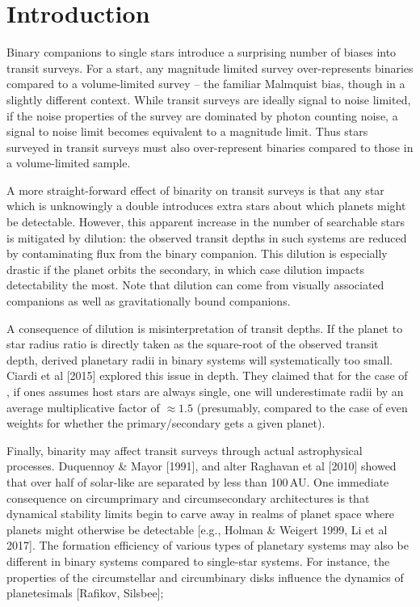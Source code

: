 \documentclass{emulateapj}
\begin{document}

\section{Introduction}

Binary companions to single stars introduce a surprising number of biases into 
transit surveys.
For a start, any magnitude limited survey over-represents binaries compared to 
a volume-limited survey -- the familiar Malmquist bias, though in a slightly 
different context.
While transit surveys are ideally signal to noise limited, if the noise 
properties of the survey are dominated by photon counting noise, a signal to 
noise limit becomes equivalent to a magnitude limit.
Thus stars surveyed in transit surveys must also over-represent binaries 
compared to those in a volume-limited sample.

A more straight-forward effect of binarity on transit surveys is that any star 
which is unknowingly a double introduces extra stars about which planets might 
be detectable.
However, this apparent increase in the number of searchable stars is mitigated 
by dilution: the observed transit depths in such systems are reduced by 
contaminating flux from the binary companion. This dilution is especially 
drastic if the planet orbits the secondary, in which case dilution impacts 
detectability the most.
Note that dilution can come from visually associated companions as well as 
gravitationally bound companions.

A consequence of dilution is misinterpretation of transit depths. If the 
planet to star radius ratio is directly taken as the square-root of 
the observed transit depth, derived planetary radii in binary systems will 
systematically too small.
Ciardi et al [2015] explored this issue in depth. They claimed that for the 
case of \kepler, if ones assumes host stars are always single, one will
underestimate radii by an average multiplicative factor of $\approx 1.5$ 
(presumably, compared to the case of even weights for whether the 
primary/secondary gets a given planet).

Finally, binarity may affect transit surveys through actual astrophysical 
processes.
Duquennoy \& Mayor [1991], and alter Raghavan et al [2010] showed that over 
half of solar-like are separated by less than 100\,AU.
One immediate consequence on circumprimary and circumsecondary architectures is 
that dynamical stability limits begin to carve away in realms of planet space 
where planets might otherwise be detectable [e.g., Holman \& Weigert 1999, Li 
et al 2017].
The formation efficiency of various types of planetary systems may also 
be different in binary systems compared to single-star systems.
For instance, the properties of the circumstellar and circumbinary disks 
influence the dynamics of planetesimals [Rafikov, Silsbee]; 
\end{document}
